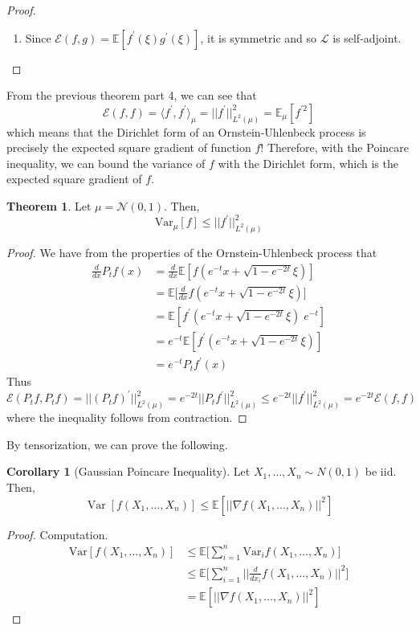 \documentclass{article}
\DeclareMathOperator{\Var}{Var}
\theoremstyle{definition}
\newtheorem{theorem}{Theorem}[section]
\newtheorem{corollary}{Corollary}[theorem]
\theoremstyle{remark}
\theoremstyle{definition}
\begin{document}
\begin{proof}
\begin{enumerate}
    \item Since $\mathcal{E}(f, g) = \mathbb{E}[f^\prime(\xi) g^\prime (\xi)]$, it is symmetric and so $\mathscr{L}$ is self-adjoint. 
\end{enumerate}

\end{proof}

From the previous theorem part 4, we can see that 
\[\mathcal{E}(f, f) = \langle f^\prime, f^\prime \rangle_\mu = ||f^\prime||_{L^2(\mu)}^2 = \mathbb{E}_\mu[ f^{\prime 2} ]\]
which means that the Dirichlet form of an Ornstein-Uhlenbeck process is precisely the expected square gradient of function $f$! Therefore, with the Poincare inequality, we can bound the variance of $f$ with the Dirichlet form, which is the expected square gradient of $f$. 

\begin{theorem}
Let $\mu = \mathcal{N}(0, 1)$. Then, 
\[\mathrm{Var}_\mu [f] \leq ||f^\prime||_{L^2(\mu)}^2\]
\end{theorem}
\begin{proof}
We have from the properties of the Ornstein-Uhlenbeck process that
\begin{align*}
    \frac{d}{dx} P_t f(x) & = \frac{d}{dx} \mathbb{E}[ f(e^{-t} x + \sqrt{1 - e^{-2t}} \xi)] \\
    & = \mathbb{E} \bigg[ \frac{d}{dx} f(e^{-t} x + \sqrt{1 - e^{-2t}} \xi)] \\
    & = \mathbb{E}[f^\prime (e^{-t} x + \sqrt{1 - e^{-2t}} \xi) \; e^{-t}] \\
    & = e^{-t} \mathbb{E}[f^\prime (e^{-t} x + \sqrt{1 - e^{-2t}} \xi)] \\
    & = e^{-t} P_t f^\prime (x) 
\end{align*}
Thus
\[\mathcal{E}(P_t f, P_t f) = ||(P_t f)^\prime||_{L^2 (\mu)}^2 = e^{-2t} || P_t f^\prime ||^2_{L^2(\mu)} \leq e^{-2t} ||f^\prime||^2_{L^2(\mu)} = e^{-2t} \mathcal{E}(f, f) \]
where the inequality follows from contraction. 
\end{proof}

By tensorization, we can prove the following. 

\begin{corollary}[Gaussian Poincare Inequality]
Let $X_1, \ldots, X_n \sim N(0, 1)$ be iid. Then, 
\[\Var[ f(X_1, \ldots, X_n)] \leq \mathbb{E}[ || \nabla f (X_1, \ldots, X_n)||^2 ]\]
\end{corollary}
\begin{proof}
Computation. 
\begin{align*}
    \mathrm{Var}[f(X_1, \ldots, X_n)] & \leq \mathbb{E} \bigg[ \sum_{i=1}^n \mathrm{Var}_i f(X_1, \ldots, X_n) \bigg] \\
    & \leq \mathbb{E} \bigg[ \sum_{i=1}^n \bigg| \bigg| \frac{d}{dx_i} f(X_1, \ldots, X_n)\bigg|\bigg|^2 \bigg] \\
    & = \mathbb{E}[ ||\nabla f (X_1, \ldots, X_n) ||^2 ]
\end{align*}
\end{proof}
\end{document}
